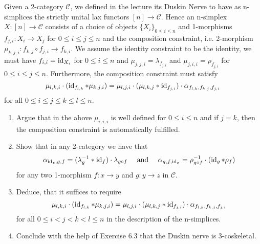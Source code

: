 \begin{Exercise}
\label{exercise_identity_duskin_skeletalality}
	Given a 2-category $ \mathcal{ C } $, we defined in the lecture its Duskin Nerve to have as n-simplices the strictly unital lax functors $ [ n ] \to \mathcal{ C } $.
	Hence an n-simplex $ X \colon [ n ] \to \mathcal{ C } $ consists of a choice of objects $ \{ X_i \}_{ 0 \leq i \leq n } $ and 1-morphisms $ f_{ j , i } \colon  X_i \to X_j $ for $ 0 \leq i \leq j \leq n $ and the composition constraint, i.e. 2-morphism $ \mu_{ k , j , i } \colon f_{ k , j } \circ f_{ j , i } \to f_{ k , i } $.
	We assume the identity constraint to be the identity, we must have $ f_{ i, i }  = \operatorname{id}_{ X_i } $ for $ 0 \leq i \leq n $ and $ \mu_{ j , j , i } = \lambda_{ f_{ j , i } } $ and $ \mu_{ j , i , i } = \rho_{ f_{ j , i } } $ for $ 0 \leq i \leq j \leq n$.
	Furthermore, the composition constraint must satisfy
	\[
		\mu_{ l , k , i } \cdot ( \operatorname{id}_{ f_{ l , k } } * \mu_{ k , j , i } ) = \mu_{ l , j , i } \cdot ( \mu_{ l , k , j } * \operatorname{id}_{ f_{ j , i } } ) \cdot \alpha_{ f_{ l , k } , f_{ k , j } , f_{ j , i } }
	\]
	for all $ 0 \leq i \leq j \leq k \leq l \leq n $.
	
	\begin{enumerate}[label=(\alph*)]
		\item 
		Argue that in the above $ \mu_{ i , i , i } $ is well defined for $ 0 \leq i \leq n $ and if $ j = k $, then the composition constraint is automatically fulfilled.
		
		\item 
		Show that in any 2-category we have that 
		\[
		\alpha_{ \operatorname{id}_z , g , f } = ( \lambda_g^{ - 1 } * \operatorname{id}_f ) \cdot \lambda_{ g \circ f } \quad \text{ and } \quad \alpha_{ g , f , \operatorname{id}_x } = \rho_{ g \circ f }^{ - 1 } \cdot ( \operatorname{id}_g * \rho_f ) 
		\]
		for any two 1-morphism $ f \colon x \to y $ and $ g \colon y \to z $ in $ \mathcal{ C } $.
		
		\item 
		Deduce, that it suffices to require
		\[
		\mu_{ l , k , i } \cdot ( \operatorname{id}_{ f_{ l , k } } * \mu_{ k , j , i } ) 
		=
		\mu_{ l , j , i } \cdot ( \mu_{ l , k , j } * \operatorname{id}_{ f_{ j , i } } ) \cdot 
		\alpha_{ f_{ l , k } , f_{ k , j } , f_{ j , i } } 
		\]
		for all $ 0 \leq i < j < k < l \leq n $ in the description of the n-simplices.
		
		\item 
		Conclude with the help of Exercise 6.3 that the Duskin nerve is 3-coskeletal.
	\end{enumerate}
\end{Exercise}

